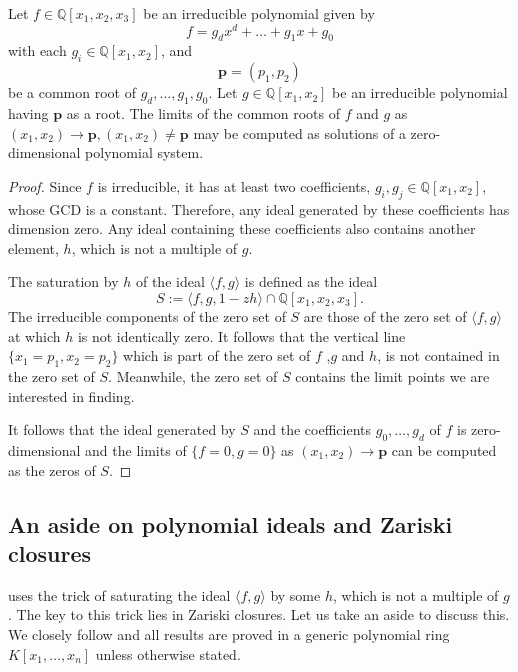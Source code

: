 \documentclass[
]{book}
\theoremstyle{definition}
\theoremstyle{definition}
\theoremstyle{definition}
\theoremstyle{definition}
\theoremstyle{remark}
\begin{document}
\citep[Proposition 5.14]{lazard10}
Let \(f \in \mathbb{Q}[x_1,x_2,x_3]\) be an irreducible polynomial given by
\[f = g_dx^d + \ldots + g_1x + g_0\]
with each \(g_i \in \mathbb{Q}[x_1,x_2]\), and
\[\mathbf{p} = (p_1,p_2)\]
be a common root of \(g_d,\ldots,g_1,g_0\).
Let \(g\in \mathbb{Q}[x_1,x_2]\) be an irreducible polynomial having \(\mathbf{p}\) as a root.
The limits of the common roots of \(f\) and \(g\) as \((x_1, x_2) \to \mathbf{p}, (x_1, x_2) \ne \mathbf{p}\) may be computed as solutions of a zero-dimensional
polynomial system.

\begin{proof}
Since \(f\) is irreducible, it has at least two coefficients, \(g_i,g_j \in \mathbb{Q}[x_1,x_2]\), whose GCD is a constant.
Therefore, any ideal generated by these coefficients has dimension zero. Any ideal containing these coefficients also contains another element, \(h\), which is not a multiple of \(g\).

The saturation by \(h\) of the ideal \(\langle f,g \rangle\) is defined as the ideal
\[
S := \langle f, g, 1 - zh \rangle \cap \mathbb{Q}[x_1,x_2,x_3].
\]
The irreducible components of the zero set of \(S\) are those of the zero set of \(\langle f,g \rangle\) at which \(h\) is not identically zero. It follows that the vertical line \(\{ x_1 = p_1, x_2 = p_2 \}\) which is part of the zero set of \(f\) ,\(g\) and \(h\), is not contained in the zero set of \(S\). Meanwhile, the zero set of \(S\) contains the limit points we are interested in finding.

It follows that the ideal generated by \(S\) and the coefficients \(g_0,\ldots,g_d\) of \(f\) is zero-dimensional and the limits of \(\{ f=0,g=0 \}\) as \((x_1,x_2) \to \mathbf{p}\) can be computed as the zeros of \(S\).
\end{proof}

\hypertarget{an-aside-on-polynomial-ideals-and-zariski-closures}{%
\subsection{An aside on polynomial ideals and Zariski closures}\label{an-aside-on-polynomial-ideals-and-zariski-closures}}

\citet{lazard10} uses the trick of saturating the ideal \(\langle f,g \rangle\) by some \(h\), which is not a multiple of \(g\). The key to this trick lies in Zariski closures. Let us take an aside to discuss this. We closely follow \citet{cox2013} and all results are proved in a generic polynomial ring \(K[x_1,\ldots,x_n]\) unless otherwise stated.
\end{document}

